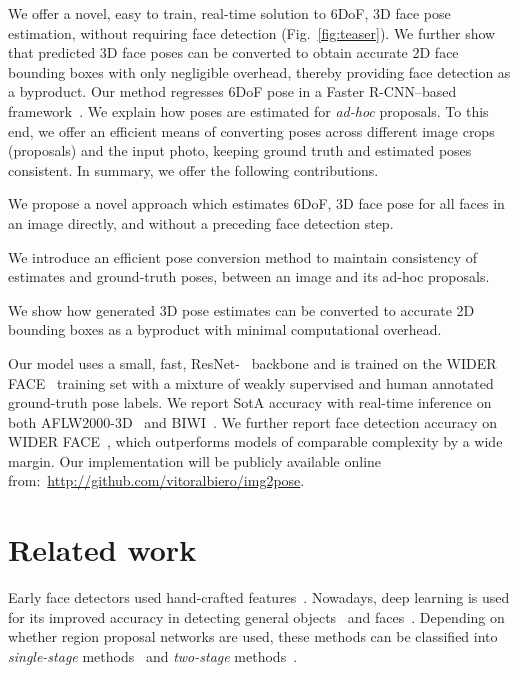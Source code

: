 \documentclass[final]{cvpr}
\newenvironment{tight_itemize}{
\begin{itemize}
  \setlength{\topsep}{0pt}
  \setlength{\itemsep}{2pt}
  \setlength{\parskip}{0pt}
  \setlength{\parsep}{0pt}
}{\end{itemize}}
\begin{document}
We offer a novel, easy to train, real-time solution to 6DoF, 3D face pose estimation, without requiring face detection (Fig.~\ref{fig:teaser}). We further show that predicted 3D face poses can be converted to obtain accurate 2D face bounding boxes with only negligible overhead, thereby providing face detection as a byproduct. Our method regresses 6DoF pose in a Faster R-CNN--based framework~\cite{faster_rcnn}. We explain how poses are estimated for {\em ad-hoc} proposals. To this end, we offer an efficient means of converting poses across different image crops (proposals) and the input photo, keeping ground truth and estimated poses consistent. In summary, we offer the following contributions. 
\begin{tight_itemize}
\item We propose a novel approach which estimates 6DoF, 3D face pose for all faces in an image directly, and without a preceding face detection step.
\item We introduce an efficient pose conversion method to maintain consistency of estimates and ground-truth poses, between an image and its ad-hoc proposals. 
\item We show how generated 3D pose estimates can be converted to accurate 2D bounding boxes as a byproduct with minimal computational overhead. 
\end{tight_itemize}
Our model uses a small, fast, ResNet-~\cite{resnet} backbone and is trained on the WIDER FACE~\cite{wider_face} training set with a mixture of weakly supervised and human annotated ground-truth pose labels. We report SotA accuracy with real-time inference on both AFLW2000-3D~\cite{3ddfa} and BIWI~\cite{biwi}. We further report face detection accuracy on WIDER FACE~\cite{wider_face}, which outperforms models of comparable complexity by a wide margin. Our implementation will be publicly available online from:~\url{http://github.com/vitoralbiero/img2pose}.  



\section{Related work}
 Early face detectors used hand-crafted features~\cite{HOG, edgeori, haar}. Nowadays, deep learning is used for its improved accuracy in detecting general objects~\cite{faster_rcnn} and faces~\cite{retinaface, asfd}. Depending on whether region proposal networks are used, these methods can be classified into {\em single-stage} methods~\cite{ssd, redmon2016yolo9000, yolov3} and {\em two-stage} methods~\cite{faster_rcnn}.
\end{document}
